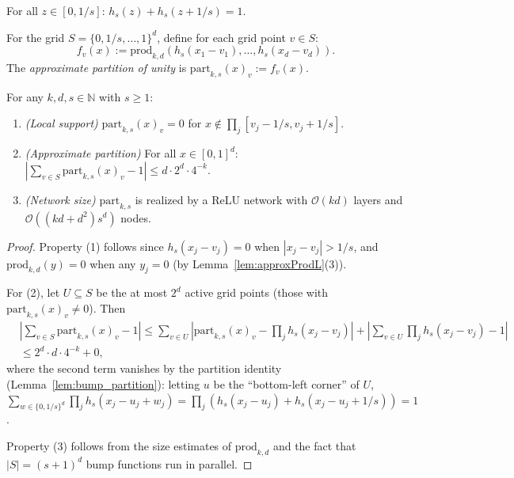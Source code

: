 \begin{lemma}\label{lem:bump_partition}
For all $z \in [0, 1/s]$: $h_s(z) + h_s(z + 1/s) = 1$.
\end{lemma}

\begin{definition}\label{def:partitionOfUnity}
For the grid $S = \{0, 1/s, \ldots, 1\}^d$, define for each grid point $v \in S$:
\[
  f_v(x) := \mathrm{prod}_{k,d}(h_s(x_1 - v_1), \ldots, h_s(x_d - v_d)).
\]
The \emph{approximate partition of unity} is $\mathrm{part}_{k,s}(x)_v := f_v(x)$.
\end{definition}

\begin{lemma}\label{lem:partitionOfUnity}
For any $k, d, s \in \mathbb{N}$ with $s \geq 1$:
\begin{enumerate}
  \item \emph{(Local support)} $\mathrm{part}_{k,s}(x)_v = 0$ for $x \notin \prod_j [v_j - 1/s, v_j + 1/s]$.
  \item \emph{(Approximate partition)} For all $x \in [0,1]^d$:
    $\left|\sum_{v \in S} \mathrm{part}_{k,s}(x)_v - 1\right| \leq d \cdot 2^d \cdot 4^{-k}$.
  \item \emph{(Network size)} $\mathrm{part}_{k,s}$ is realized by a ReLU network with
    $\mathcal{O}(kd)$ layers and $\mathcal{O}((kd + d^2) s^d)$ nodes.
\end{enumerate}
\end{lemma}

\begin{proof}
  Property (1) follows since $h_s(x_j - v_j) = 0$ when $|x_j - v_j| > 1/s$,
  and $\mathrm{prod}_{k,d}(y) = 0$ when any $y_j = 0$ (by Lemma~\ref{lem:approxProdL}(3)).

  For (2), let $U \subseteq S$ be the at most $2^d$ active grid points (those with $\mathrm{part}_{k,s}(x)_v \neq 0$).
  Then
  \begin{align*}
    &\left|\sum_{v \in S} \mathrm{part}_{k,s}(x)_v - 1\right|
    \leq \sum_{v \in U} |\mathrm{part}_{k,s}(x)_v - \prod_j h_s(x_j - v_j)|
      + \left|\sum_{v \in U} \prod_j h_s(x_j - v_j) - 1\right| \\
    &\leq 2^d \cdot d \cdot 4^{-k} + 0,
  \end{align*}
  where the second term vanishes by the partition identity (Lemma~\ref{lem:bump_partition}):
  letting $u$ be the ``bottom-left corner'' of $U$,
  $\sum_{w \in \{0,1/s\}^d} \prod_j h_s(x_j - u_j + w_j) = \prod_j (h_s(x_j - u_j) + h_s(x_j - u_j + 1/s)) = 1$.

  Property (3) follows from the size estimates of $\mathrm{prod}_{k,d}$ and the fact that
  $|S| = (s+1)^d$ bump functions run in parallel.
\end{proof}

